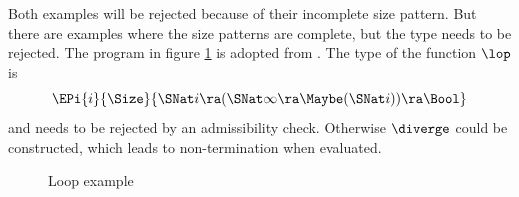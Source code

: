 Both examples will be rejected because of their incomplete size pattern.
But there are examples where the size patterns are complete, but the type needs to be rejected.
The program in figure \ref{loop} is adopted from \cite{abel:PhD}. The type of the function $\lop$ is   
\[\EPi{i}{\Size}{\SNat i \ra (\SNat \infty \ra \Maybe (\SNat i)) \ra \Bool} \]
and needs to be rejected by an admissibility check. Otherwise $\diverge$ could be constructed, which leads to non-termination
when evaluated.
\begin{figure}[p]
\caption{Loop example}
\label{loop}
\end{figure}


